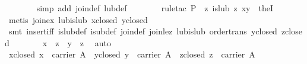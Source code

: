 \begin{isabellebody}
\ \ \ \ \ \ \isamarkupfalse%
\ {}simp\ add{}\ join{}def\ lub{}def{}\isanewline
\ \ \ \ \ \ \isamarkupfalse%
\ {}rule{}tac\ {}P\ {}\ {}{}z{}\ is{}lub\ z\ {}x{}y{}{}\ \ the{}I{}{}\isanewline
\ \ \ \ \ \ \isamarkupfalse%
\ {}metis\ join{}ex\ lub{}is{}lub\ x{}closed\ y{}closed{}\isanewline
\ \ \ \ \ \ \isamarkupfalse%
\ {}smt\ insert{}iff\ is{}lub{}def\ is{}ub{}def\ join{}def\ join{}le{}z\ lub{}is{}lub\ order{}trans\ y{}closed\ z{}closed{}\isanewline
\ \ \ \ \isamarkupfalse%
\ \isamarkupfalse%
\ {}x\ {}\ z\ {}\ y\ {}\ z{}\ \isamarkupfalse%
\ auto\isanewline
\ \ \isamarkupfalse%
\isanewline
\ \ \ \ \isamarkupfalse%
\ x{}closed{}\ {}x\ {}\ carrier\ A{}\ \ y{}closed{}\ {}y\ {}\ carrier\ A{}\ \ z{}closed{}\ {}z\ {}\ carrier\ A{}\isanewline

\end{isabellebody}
